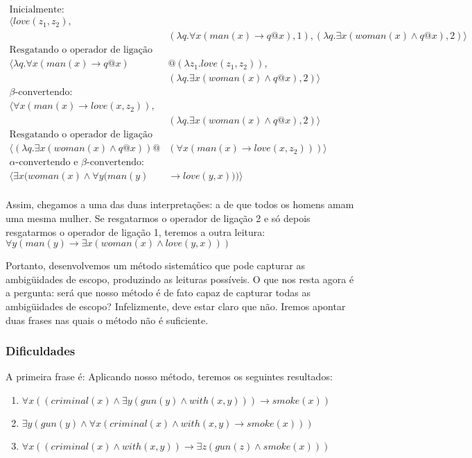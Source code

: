 \begin{align*}
 \text{Inicialmente:} \\
 \langle love(z_1,z_2),& \\ &(\lambda q. \forall x(man(x) \rightarrow q@x), 1),  (\lambda q. \exists x(woman(x) \land q@x),2) \rangle \\
 \text{Resgatando o operador de ligação 1:}  \\
 \langle \lambda q. \forall x(man(x) \rightarrow q@x) &@ (\lambda z_1 . love(z_1,z_2)),  \\&(\lambda q. \exists x(woman(x) \land q@x),2)\rangle \\
 \beta\text{-convertendo:} \\
 \langle \forall x (man(x) \rightarrow love(x,z_2)), &\\&(\lambda q. \exists x(woman(x) \land q@x),2)\rangle \\
 \text{Resgatando o operador de ligação 2:} \\
 \langle (\lambda q. \exists x(woman(x) \land q@x))@&(\forall x (man(x) \rightarrow love(x,z_2))) \rangle  \\
 \alpha\text{-convertendo e }  \beta\text{-convertendo:} \\
 \langle \exists x (woman(x) \land \forall y(man(y) &\rightarrow love(y,x))) \rangle  \\
\end{align*}

Assim, chegamos a uma das duas interpretações: a de que todos os homens amam uma mesma mulher. Se resgatarmos o operador de ligação 2 e só depois resgatarmos o operador de ligação 1, teremos a outra leitura: $\forall y(man(y) \rightarrow \exists x (woman (x) \land love(y,x)))$

Portanto, desenvolvemos um método sistemático que pode capturar as ambigüidades de escopo, produzindo as leituras possíveis. O que nos resta agora é a pergunta: será que nosso método é de fato capaz de capturar todas as ambigüidades de escopo? Infelizmente, deve estar claro que não. Iremos apontar duas frases nas quais o método não é suficiente.

\subsubsection{Dificuldades}

A primeira frase é:  Aplicando nosso método, teremos os seguintes resultados:
\begin{enumerate}
\item $\forall x((criminal(x) \land \exists y (gun(y) \land with(x,y))) \rightarrow smoke(x))$
\item $\exists y(gun(y) \land \forall x(criminal(x) \land with(x,y) \rightarrow smoke(x)))$
\item $\forall x((criminal(x) \land with(x,y)) \rightarrow \exists z(gun(z) \land smoke(x))) $
\end{enumerate}

